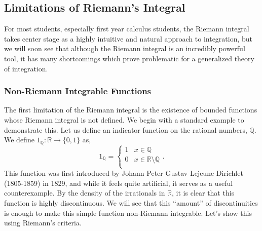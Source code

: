 \documentclass{article}
\theoremstyle{axiom} \newtheorem{axiom}{Axiom}
\theoremstyle{definition} \newtheorem{definition}{Definition}
\theoremstyle{example} \newtheorem{example}{Example}
\theoremstyle{proposition} \newtheorem{prop}{Proposition}
\theoremstyle{lemma} \newtheorem{lemma}{Lemma}
\newcommand{\Q}{\mathbb{Q}}  \newcommand{\R}{\mathbb{R}}
\begin{document}
\subsection{Limitations of Riemann's Integral} \label{sec:nonrie}

For most students, especially first year calculus students, the Riemann integral 
takes center stage as a highly intuitive and natural approach to integration, 
but we will soon see that although the Riemann integral is an incredibly 
powerful tool, it has many shortcomings which prove problematic for a
generalized theory of integration.

\subsubsection{Non-Riemann Integrable Functions}

The first limitation of the Riemann integral is the existence of bounded
functions whose Riemann integral is not defined. We begin with a standard 
example to demonstrate this. Let us define an indicator function on the
rational numbers, $\Q$. We define 
$1_{\Q}:\R \rightarrow \{0,1\}$ as,
\begin{equation*}
	1_{\Q} = \begin{cases}
		1 & x\in \Q  \\
		0 & x \in \R\setminus \Q \\
	\end{cases}.
\end{equation*}
This function was first introduced by  Johann Peter Gustav Lejeune Dirichlet
(1805-1859) in 1829, and while it feels quite artificial, it serves as a
useful counterexample. By the density of the irrationals in $\R$, it is clear 
that this function is highly discontinuous. We will see that this ``amount'' of discontinuities is enough to 
make this simple function non-Riemann integrable. Let's show this using 
Riemann's criteria.
\end{document}
